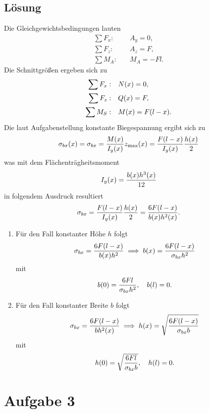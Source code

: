 \documentclass{exercise}
\begin{document}
    \subsection*{Lösung}
    Die Gleichgewichtsbedingungen lauten
    \begin{align*}
        \sum F_x: &\quad A_y = 0,\\
        \sum F_z: &\quad A_z = F,\\
        \sum M_A: &\quad M_A = -Fl.
    \end{align*}
    Die Schnittgrößen ergeben sich zu
    \begin{align*}
        \sum F_x: &\quad N\parentheses*{x} = 0,\\
        \sum F_z: &\quad Q\parentheses*{x} = F,\\
        \sum M_S: &\quad M\parentheses*{x} = F\parentheses*{l - x}.
    \end{align*}
    Die laut Aufgabenstellung konstante Biegespannung ergibt sich zu
    \[
        \sigma_{bx}\parentheses*{x} = \sigma_{bx} = \frac{M\parentheses*{x}}{I_y\parentheses*{x}}z_{\text{max}}\parentheses*{x} = \frac{F\parentheses*{l - x}}{I_y\parentheses*{x}}\frac{h\parentheses*{x}}{2}
    \]
    was mit dem Flächenträgheitsmoment
    \[
        I_y\parentheses*{x} = \frac{b\parentheses*{x}h^3\parentheses*{x}}{12}
    \]
    in folgendem Ausdruck resultiert
    \[
        \sigma_{bx} = \frac{F\parentheses*{l - x}}{I_y\parentheses*{x}}\frac{h\parentheses*{x}}{2} = \frac{6F\parentheses*{l - x}}{b\parentheses*{x}h^2\parentheses*{x}}.
    \]
    \begin{enumerate}
        \item Für den Fall konstanter Höhe \(h\) folgt
        \[
            \sigma_{bx} = \frac{6F\parentheses*{l - x}}{b\parentheses*{x}h^2} \implies b\parentheses*{x} = \frac{6F\parentheses*{l - x}}{\sigma_{bx}h^2}
        \]
        mit
        \[
            b\parentheses*{0} = \frac{6Fl}{\sigma_{bx}h^2}, \quad b\parentheses*{l} = 0.
        \]
        \item Für den Fall konstanter Breite \(b\) folgt
        \[
            \sigma_{bx} = \frac{6F\parentheses*{l - x}}{bh^2\parentheses*{x}} \implies h\parentheses*{x} = \sqrt{\frac{6F\parentheses*{l - x}}{\sigma_{bx}b}}
        \]
        mit
        \[
            h\parentheses*{0} = \sqrt{\frac{6Fl}{\sigma_{bx}b}}, \quad h\parentheses*{l} = 0.
        \]
    \end{enumerate}
    
    
    \section*{Aufgabe 3}
    
\end{document}
